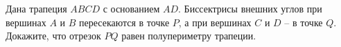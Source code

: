 \begin{ex}
	\begin{condition}
		Дана трапеция \( ABCD  \) с основанием \( AD \). Биссектрисы внешних углов при вершинах \( A  \) и \( B  \) пересекаются в точке \( P \), а при вершинах \( C  \) и \( D \) – в точке \( Q \). Докажите, что отрезок \( PQ \) равен полупериметру трапеции.
	\end{condition}
\end{ex}